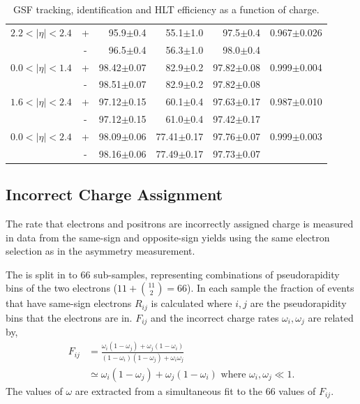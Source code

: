\begin{table}[htbp]
\begin{center}
\begin{tabular}{lcrrrr}
$2.2<| \eta |<2.4$ &+& 95.9$\pm$0.4 &55.1$\pm$1.0 &97.5$\pm$0.4 & 0.967$\pm$0.026\\
                   &-& 96.5$\pm$0.4 &56.3$\pm$1.0 &98.0$\pm$0.4 & \\
\midrule
$0.0<| \eta |<1.4$ &+& 98.42$\pm$0.07 &82.9$\pm$0.2 &97.82$\pm$0.08 & 0.999$\pm$0.004\\
                   &-& 98.51$\pm$0.07 &82.9$\pm$0.2 &97.82$\pm$0.08 & \\
$1.6<| \eta |<2.4$ &+& 97.12$\pm$0.15 &60.1$\pm$0.4 &97.63$\pm$0.17 & 0.987$\pm$0.010\\
                   &-& 97.12$\pm$0.15 &61.0$\pm$0.4 &97.42$\pm$0.17 & \\
\midrule
$0.0<| \eta |<2.4$ &+& 98.09$\pm$0.06 &77.41$\pm$0.17 &97.76$\pm$0.07 & 0.999$\pm$0.003\\
                   &-& 98.16$\pm$0.06 &77.49$\pm$0.17 &97.73$\pm$0.07 & \\
\bottomrule
\end{tabular}
\end{center}
\caption{\label{tab:updatedefficiency} GSF tracking, identification and HLT efficiency as a function of charge.}
\end{table}

\subsection{Incorrect Charge Assignment}
The rate that electrons and positrons are incorrectly assigned charge is measured
in data from the same-sign and opposite-sign \PZ yields using the same electron
selection as in the asymmetry measurement.

The \HepProcess{\PZ\to\Pe\Pe} is split in to 66 sub-samples, representing
combinations of pseudorapidity bins of the two electrons ($11+\binom{11}{2} =
66$).
In each sample the fraction of events that have same-sign electrons $R_{ij}$
is calculated where $i,j$ are the pseudorapidity bins that the electrons are in.
$F_{ij}$ and the incorrect charge rates $\omega_{i},\omega_{j}$ are related
by,
\begin{align}
F_{ij} &= 
\frac{
\omega_{i} \left( 1-\omega_{j} \right) + \omega_{j} \left( 1-\omega_{i} \right) 
}{
\left( 1-\omega_{i} \right) \left( 1-\omega_{j} \right) + \omega_{i} \omega_{j}
} \\
&\simeq \omega_{i} \left( 1-\omega_{j} \right) + \omega_{j} \left( 1-\omega_{i} \right) 
\text{ where } \omega_i,\omega_j\ll1  .
\end{align}
The values of $\omega$ are extracted from a simultaneous fit to the 66 values
of $F_{ij}$.

